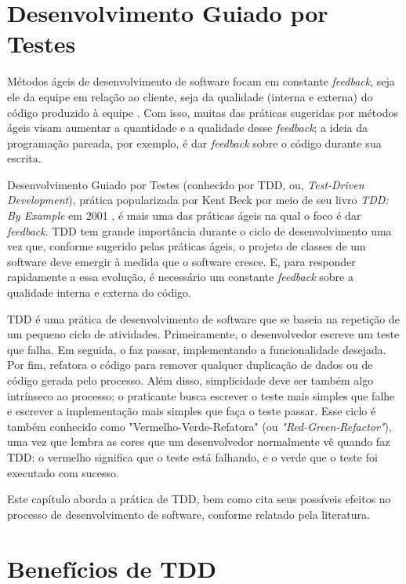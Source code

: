 \section{Desenvolvimento Guiado por Testes}

Métodos ágeis de desenvolvimento de software focam em constante
\textit{feedback}, seja ele da equipe em relação ao cliente, seja da
qualidade (interna e externa) do código produzido à equipe \cite{AgileManifesto}.
Com isso, muitas das práticas sugeridas por métodos ágeis visam aumentar a 
quantidade e a qualidade desse \textit{feedback}; a ideia da programação pareada, por
exemplo, é dar \textit{feedback} sobre o código durante sua escrita.

Desenvolvimento Guiado por Testes (conhecido por TDD, ou, \textit{Test-Driven
Development}), prática popularizada por Kent Beck por meio de seu livro
\textit{TDD: By Example} em 2001 \cite{TDDByExample}, é mais uma das práticas 
ágeis na qual o foco é dar \textit{feedback}. TDD tem grande importância durante o ciclo
de desenvolvimento uma vez que, conforme sugerido pelas práticas ágeis, o projeto de classes de um
software deve emergir à medida que o software cresce. E, para responder
rapidamente a essa evolução, é necessário um constante \textit{feedback} sobre a
qualidade interna e externa do código.

TDD é uma prática de desenvolvimento de software que se baseia na repetição de
um pequeno ciclo de atividades. Primeiramente, o desenvolvedor escreve um
teste que falha. Em seguida, o faz passar, implementando a
funcionalidade desejada. Por fim, refatora o código para remover qualquer
duplicação de dados ou de código gerada pelo processo.
Além disso, simplicidade deve ser também algo intrínseco ao processo; o praticante
busca escrever o teste mais simples que falhe e escrever a implementação mais simples
que faça o teste passar.
Esse ciclo
é também conhecido como 
"Vermelho-Verde-Refatora" (ou \textit{"Red-Green-Refactor"}), uma vez que lembra as cores que um 
desenvolvedor normalmente vê quando faz TDD: o vermelho significa que
o teste está falhando, e o verde que o teste foi executado com sucesso.

Este capítulo aborda a prática de TDD, bem como cita
seus possíveis efeitos no processo de desenvolvimento de software, conforme relatado pela
literatura.

\section{Benefícios de TDD}

